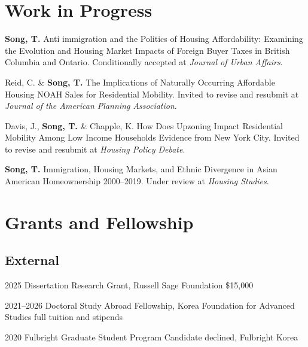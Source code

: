 \documentclass[10pt,letterpaper]{article}
\newcommand{\listitemspace}{0.25em}
\renewenvironment{itemize}
{\begin{list}{}{\setlength{\leftmargin}{1em}
\setlength{\parskip}{0em}
\setlength{\itemsep}{\listitemspace}
\setlength{\parsep}{\listitemspace}}}
{\end{list}}
\begin{document}
\section{Work in Progress}

\begin{itemize}
  \item \textbf{Song, T.} Anti immigration and the Politics of Housing Affordability: Examining the Evolution and Housing Market Impacts of Foreign Buyer Taxes in British Columbia and Ontario. Conditionally accepted at \emph{Journal of Urban Affairs}.
  \item Reid, C. \& \textbf{Song, T.} The Implications of Naturally Occurring Affordable Housing NOAH Sales for Residential Mobility. Invited to revise and resubmit at \emph{Journal of the American Planning Association}.
  \item Davis, J., \textbf{Song, T.} \& Chapple, K. How Does Upzoning Impact Residential Mobility Among Low Income Households Evidence from New York City. Invited to revise and resubmit at \emph{Housing Policy Debate}.
  \item \textbf{Song, T.} Immigration, Housing Markets, and Ethnic Divergence in Asian American Homeownership 2000–2019. Under review at \emph{Housing Studies}.
\end{itemize}

\section{Grants and Fellowship}

\subsection{External}
\begin{tablist}
  \item[2025] \tab{}Dissertation Research Grant, Russell Sage Foundation \$15,000
  \item[2021–2026] \tab{}Doctoral Study Abroad Fellowship, Korea Foundation for Advanced Studies full tuition and stipends
  \item[2020] \tab{}Fulbright Graduate Student Program Candidate declined, Fulbright Korea
\end{tablist}
\end{document}
